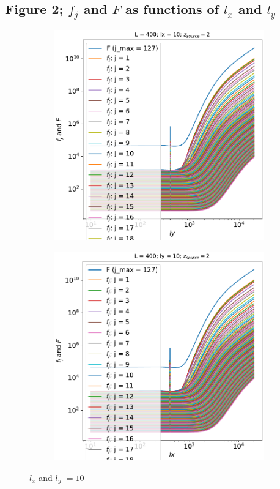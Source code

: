 \documentclass[12pt]{article}
\numberwithin{equation}{section}
\begin{document}
\subsection{Figure 2; $ f_j $ and $ F $ as functions of $ l_x $ and $ l_y $}
\begin{figure}
	\centering
	\begin{subfigure}{0.49\textwidth}
		\centering
		\includegraphics[width=\textwidth]{lx_10_L_400}
		\caption{}
		\label{fig:21cm-powspec}
	\end{subfigure}
	\begin{subfigure}{0.49\textwidth}
		\centering
		\includegraphics[width=\textwidth]{ly_10_L_400}
		\caption{}
		\label{fig:21cm-matter-powspec}
	\end{subfigure}
	\caption{$ l_x $ and $ l_y $ $ = 10 $}
\end{figure}
\end{document}
